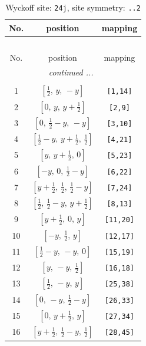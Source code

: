\documentclass[fleqn,8pt]{jsarticle}
\begin{document}
\begin{longtable}{ccc}
\caption{Wyckoff site: {\tt 24j}, site symmetry: {\tt ..2}}
 \\
 \hline \hline
No. & position & mapping \\ \hline \endfirsthead

\multicolumn{2}{l}{\tablename\ \thetable{}} \\
 \hline \hline
No. & position & mapping \\ \hline \endhead

 \hline \hline
\multicolumn{2}{r}{\footnotesize\it continued ...} \\ \endfoot

 \hline \hline
\multicolumn{2}{r}{} \\ \endlastfoot

1 & $\left[ \frac{1}{2},\, y,\, - y \right]$ & {\tt [1,14]} \\ \hline
2 & $\left[ 0,\, y,\, y + \frac{1}{2} \right]$ & {\tt [2,9]} \\ \hline
3 & $\left[ 0,\, \frac{1}{2} - y,\, - y \right]$ & {\tt [3,10]} \\ \hline
4 & $\left[ \frac{1}{2} - y,\, y + \frac{1}{2},\, \frac{1}{2} \right]$ & {\tt [4,21]} \\ \hline
5 & $\left[ y,\, y + \frac{1}{2},\, 0 \right]$ & {\tt [5,23]} \\ \hline
6 & $\left[ - y,\, 0,\, \frac{1}{2} - y \right]$ & {\tt [6,22]} \\ \hline
7 & $\left[ y + \frac{1}{2},\, \frac{1}{2},\, \frac{1}{2} - y \right]$ & {\tt [7,24]} \\ \hline
8 & $\left[ \frac{1}{2},\, \frac{1}{2} - y,\, y + \frac{1}{2} \right]$ & {\tt [8,13]} \\ \hline
9 & $\left[ y + \frac{1}{2},\, 0,\, y \right]$ & {\tt [11,20]} \\ \hline
10 & $\left[ - y,\, \frac{1}{2},\, y \right]$ & {\tt [12,17]} \\ \hline
11 & $\left[ \frac{1}{2} - y,\, - y,\, 0 \right]$ & {\tt [15,19]} \\ \hline
12 & $\left[ y,\, - y,\, \frac{1}{2} \right]$ & {\tt [16,18]} \\ \hline
13 & $\left[ \frac{1}{2},\, - y,\, y \right]$ & {\tt [25,38]} \\ \hline
14 & $\left[ 0,\, - y,\, \frac{1}{2} - y \right]$ & {\tt [26,33]} \\ \hline
15 & $\left[ 0,\, y + \frac{1}{2},\, y \right]$ & {\tt [27,34]} \\ \hline
16 & $\left[ y + \frac{1}{2},\, \frac{1}{2} - y,\, \frac{1}{2} \right]$ & {\tt [28,45]} \\ \hline

\end{longtable}
\end{document}
